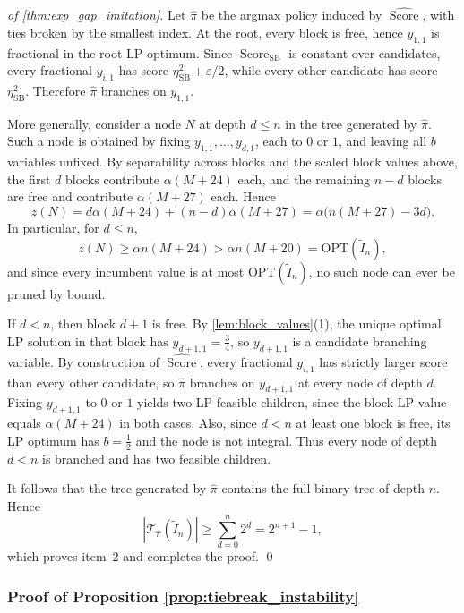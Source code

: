 \documentclass[smallextended,envcountsect]{svjour3} %
\newcommand{\Tcal}{\mathcal{T}}
\newcommand{\0}{\mathbf{0}}
\DeclareMathOperator{\Score}{Score} %
\newcommand{\1}{\mathbf{1}} %
\begin{document}
\begin{proof}[of \cref{thm:exp_gap_imitation}]
	Let $\hat\pi$ be the argmax policy induced by $\widehat{\Score}$, with ties broken by the smallest index.
	At the root, every block is free, hence $y_{1,1}$ is fractional in the root LP optimum.
	Since $\Score_{\mathrm{SB}}$ is constant over candidates, every fractional $y_{i,1}$ has score $\eta_{\mathrm{SB}}^2+\varepsilon/2$, while every other candidate has score $\eta_{\mathrm{SB}}^2$.
	Therefore $\hat\pi$ branches on $y_{1,1}$.

	More generally, consider a node $N$ at depth $d\le n$ in the tree generated by $\hat\pi$.
	Such a node is obtained by fixing $y_{1,1},\dots,y_{d,1}$, each to $0$ or $1$, and leaving all $b$ variables unfixed.
	By separability across blocks and the scaled block values above, the first $d$ blocks contribute $\alpha(M+24)$ each, and the remaining $n-d$ blocks are free and contribute $\alpha(M+27)$ each.
	Hence
	\[
		z(N)=d\alpha(M+24)+(n-d)\alpha(M+27)=\alpha\bigl(n(M+27)-3d\bigr).
	\]
	In particular, for $d\le n$,
		\[
			z(N)\ge \alpha n(M+24)>\alpha n(M+20)=\mathrm{OPT}(\widetilde I_n),
		\]
		and since every incumbent value is at most $\mathrm{OPT}(\widetilde I_n)$, no such node can ever be pruned by bound.

	If $d<n$, then block $d+1$ is free.
	By \cref{lem:block_values}(1), the unique optimal LP solution in that block has $y_{d+1,1}=\tfrac34$, so $y_{d+1,1}$ is a candidate branching variable.
	By construction of $\widehat{\Score}$, every fractional $y_{i,1}$ has strictly larger score than every other candidate, so $\hat\pi$ branches on $y_{d+1,1}$ at every node of depth $d$.
	Fixing $y_{d+1,1}$ to $0$ or $1$ yields two LP feasible children, since the block LP value equals $\alpha(M+24)$ in both cases.
	Also, since $d<n$ at least one block is free, its LP optimum has $b=\tfrac12$ and the node is not integral.
	Thus every node of depth $d<n$ is branched and has two feasible children.

	It follows that the tree generated by $\hat\pi$ contains the full binary tree of depth $n$.
	Hence
	\[
		|\Tcal_{\hat\pi}(\widetilde I_n)|\ge \sum_{d=0}^n 2^d=2^{n+1}-1,
	\]
	which proves item~2 and completes the proof.
\qed
\end{proof}

\subsubsection{Proof of Proposition \ref{prop:tiebreak_instability}}
\label{app:tiebreak_instability}
\end{document}
